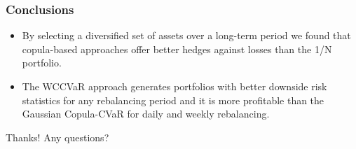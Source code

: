 \documentclass[pdf,9pt,xcolor=dvipsnames,hide notes]{beamer}
\begin{document}
\begin{frame}[label=frame9d]
	\frametitle{Conclusions}
	
	\begin{itemize}
		\justifying
		
		\item By selecting a diversified set of assets over a long-term period we found that copula-based approaches offer better hedges against losses than the 1/N portfolio.
		
		\vspace{0.3cm}
		
		\item The WCCVaR approach generates portfolios with better downside
		risk statistics for any rebalancing period and it is more profitable than the Gaussian Copula-CVaR for daily and weekly rebalancing. 
		
		
		
	\end{itemize}
	
\end{frame}


\begin{frame}

\centering
\Large{Thanks! Any questions?}

\end{frame}
\end{document}
